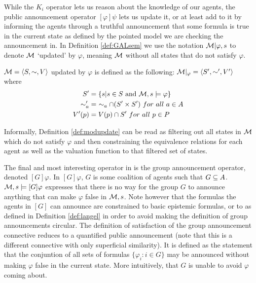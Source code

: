 While the $K_i$ operator lets us reason about the knowledge of our agents, the public announcement operator $[\varphi]\psi$ lets us update it, or at least add to it by informing the agents through a truthful announcement that some formula is true in the current state as defined by the pointed model we are checking the announcement in.
In Definition \ref{def:GALsem} we use the notation $\mathcal{M}|\varphi,s$ to denote $\mathcal{M}$ `updated' by $\varphi$, meaning $\mathcal{M}$ without all states that do not satisfy $\varphi$.

\begin{definition}
	\label{def:modupdate}
	$\mathcal{M} = \langle S,\sim,V\rangle$ updated by $\varphi$ is defined as the following: $\mathcal{M}|_\varphi = \langle S',\sim',V'\rangle$ where 
	\begin{align*}
			S' &= \{s| s\in S\textrm{ and }\mathcal{M},s \models\varphi\} \\
			\sim_a' &= ~\sim_a \cap (S' \times S')~ for ~ all ~ a\in A\\
			V'(p) &= V(p) \cap S'~ for ~ all ~ p \in P
	\end{align*}
\end{definition}

Informally, Definition \ref{def:modupdate} can be read as filtering out all states in $\mathcal{M}$ which do not satisfy $\varphi$ and then constraining the equivalence relations for each agent as well as the valuation function to that filtered set of states.

The final and most interesting operator in  is the group announcement operator, denoted $[G]\varphi$. In $[G]\varphi$, $G$ is some coalition of agents such that $G \subseteq A$. $\mathcal{M},s \models [G]\varphi$ expresses that there is no way for the group $G$ to announce anything that can make $\varphi$ false in $\mathcal{M},s$. Note however that the formulas the agents in $[G]$ can announce are constrained to basic epistemic formulas, or to  as defined in Definition \ref{def:langel} in order to avoid making the definition of group announcements circular. The definition of satisfaction of the group announcement connective reduces to a quantified public announcement (note that this is a different connective with only superficial similarity). It is defined as the statement that the conjuntion of all sets of formulas $\{\varphi_i:i\in G\}$ may be announced without making $\varphi$ false in the current state. More intuitively, that $G$ is unable to avoid $\varphi$ coming about.


